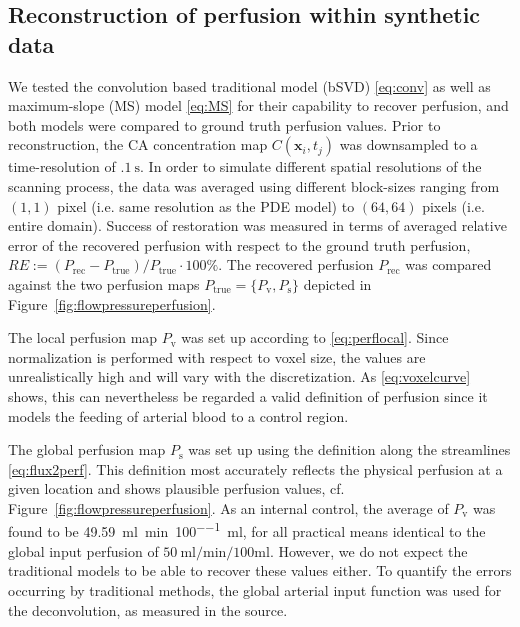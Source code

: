 \documentclass[journal,twocolumn]{IEEEtran}
\newcommand{\Perf}{P}
\newcommand{\Perfv}{P_{\mathrm{v}}}
\newcommand{\Perfs}{P_{\mathrm{s}}}
\newcommand{\siPml}{\milli\litre\per\minute\per100\milli\litre}
\begin{document}
	\subsection{Reconstruction of perfusion within synthetic data}\label{sec:RecPhantom}


	We tested the convolution based traditional model (bSVD) \eqref{eq:conv} as well as maximum-slope (MS) model \eqref{eq:MS} for their capability to recover perfusion, and both models were compared to ground truth perfusion values.
	Prior to reconstruction, the CA concentration map $C(\mathbf{x}_i,t_j)$ was downsampled to a time-resolution of $\SI{.1}{\second}$.
	In order to simulate different spatial resolutions of the scanning process, the data was averaged using different block-sizes ranging from $(1,1)$ pixel (i.e. same resolution as the PDE model) to $(64,64)$ pixels (i.e. entire domain).		
	Success of restoration was measured in terms of averaged relative error of the recovered perfusion with respect to the ground truth perfusion, $RE :=  (\Perf_{\mathrm{rec}} - \Perf_{\mathrm{true}})/\Perf_{\mathrm{true}}\cdot 100\%$.
	The recovered perfusion $\Perf_{\mathrm{rec}}$ was compared against the two perfusion maps $\Perf_{\mathrm{true}}=\{\Perfv,\Perfs\}$ depicted in Figure~\ref{fig:flowpressureperfusion}.

	The local perfusion map $\Perfv$ was set up according to \eqref{eq:perflocal}. 
	Since normalization is performed with respect to voxel size, the values are unrealistically high and will vary with the discretization.
	As \eqref{eq:voxelcurve} shows, this can nevertheless be regarded a valid definition of perfusion since it models the feeding of arterial blood to a control region.

	The global perfusion map $\Perfs$ was set up using the definition along the streamlines \eqref{eq:flux2perf}.
	This definition most accurately reflects the physical perfusion at a given location and shows plausible perfusion values, cf. Figure~\ref{fig:flowpressureperfusion}. As an internal control, the average of $\Perfv$ was found to be \SI{49.59}{\siPml}, for all practical means identical to the global input perfusion of $\SI{50}{\siPml}$.
	However, we do not expect the traditional models to be able to recover these values either.
	To quantify the errors occurring by traditional methods, the global arterial input function was used for the deconvolution, as measured in the source.
\end{document}
